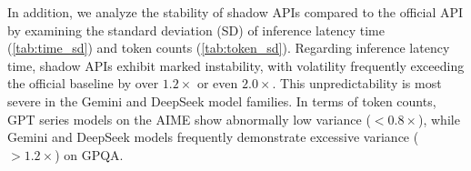 \documentclass[letterpaper,twocolumn,10pt]{article}
\begin{document}
In addition, we analyze the stability of shadow APIs compared to the official API by examining the standard deviation (SD) of inference latency time (\autoref{tab:time_sd}) and token counts (\autoref{tab:token_sd}).
Regarding inference latency time, shadow APIs exhibit marked instability, with volatility frequently exceeding the official baseline by over $1.2\times$ or even $2.0\times$. 
This unpredictability is most severe in the Gemini and DeepSeek model families. 
In terms of token counts, GPT series models on the AIME show abnormally low variance ($<0.8\times$), while Gemini and DeepSeek models frequently demonstrate excessive variance ($>1.2\times$) on GPQA.

\begin{table}[t!]
\centering
\caption{Standard deviation of inference latency time (s). Colors denote ratio vs official API, \colorbox{blue!20}{Blue} ($< 0.8\times$), \colorbox{mygreen}{Green} ($0.8\times \text{to}\ 1.2\times$), \colorbox{red!20}{Red} ($> 1.2\times$).}
\label{tab:time_sd}
\end{table}
\end{document}
